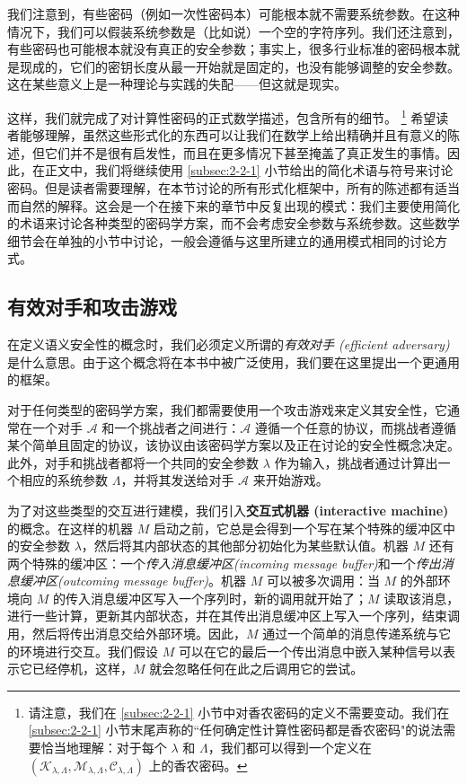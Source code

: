 我们注意到，有些密码（例如一次性密码本）可能根本就不需要系统参数。在这种情况下，我们可以假装系统参数是（比如说）一个空的字符序列。我们还注意到，有些密码也可能根本就没有真正的安全参数；事实上，很多行业标准的密码根本就是现成的，它们的密钥长度从最一开始就是固定的，也没有能够调整的安全参数。这在某些意义上是一种理论与实践的失配——但这就是现实。

这样，我们就完成了对计算性密码的正式数学描述，包含所有的细节。
\footnote{
请注意，我们在 \ref{subsec:2-2-1} 小节中对香农密码的定义不需要变动。我们在 \ref{subsec:2-2-1} 小节末尾声称的``任何确定性计算性密码都是香农密码"的说法需要恰当地理解：对于每个 $\lambda$ 和 $\Lambda$，我们都可以得到一个定义在 $(\mathcal{K}_{\lambda,\Lambda},\mathcal{M}_{\lambda,\Lambda},\mathcal{C}_{\lambda,\Lambda})$ 上的香农密码。
}
希望读者能够理解，虽然这些形式化的东西可以让我们在数学上给出精确并且有意义的陈述，但它们并不是很有启发性，而且在更多情况下甚至掩盖了真正发生的事情。因此，在正文中，我们将继续使用 \ref{subsec:2-2-1} 小节给出的简化术语与符号来讨论密码。但是读者需要理解，在本节讨论的所有形式化框架中，所有的陈述都有适当而自然的解释。这会是一个在接下来的章节中反复出现的模式：我们主要使用简化的术语来讨论各种类型的密码学方案，而不会考虑安全参数与系统参数。这些数学细节会在单独的小节中讨论，一般会遵循与这里所建立的通用模式相同的讨论方式。

\subsection{有效对手和攻击游戏}\label{subsec:2-3-3}

在定义语义安全性的概念时，我们必须定义所谓的\emph{有效对手 (efficient adversary)}是什么意思。由于这个概念将在本书中被广泛使用，我们要在这里提出一个更通用的框架。

对于任何类型的密码学方案，我们都需要使用一个攻击游戏来定义其安全性，它通常在一个对手 $\mathcal{A}$ 和一个挑战者之间进行：$\mathcal{A}$ 遵循一个任意的协议，而挑战者遵循某个简单且固定的协议，该协议由该密码学方案以及正在讨论的安全性概念决定。此外，对手和挑战者都将一个共同的安全参数 $\lambda$ 作为输入，挑战者通过计算出一个相应的系统参数 $\Lambda$，并将其发送给对手 $\mathcal{A}$ 来开始游戏。

为了对这些类型的交互进行建模，我们引入\textbf{交互式机器 (interactive machine)}的概念。在这样的机器 $M$ 启动之前，它总是会得到一个写在某个特殊的缓冲区中的安全参数 $\lambda$，然后将其内部状态的其他部分初始化为某些默认值。机器 $M$ 还有两个特殊的缓冲区：一个\emph{传入消息缓冲区(incoming message buffer)}和一个\emph{传出消息缓冲区(outcoming message buffer)}。机器 $M$ 可以被多次调用：当 $M$ 的外部环境向 $M$ 的传入消息缓冲区写入一个序列时，新的调用就开始了；$M$ 读取该消息，进行一些计算，更新其内部状态，并在其传出消息缓冲区上写入一个序列，结束调用，然后将传出消息交给外部环境。因此，$M$ 通过一个简单的消息传递系统与它的环境进行交互。我们假设 $M$ 可以在它的最后一个传出消息中嵌入某种信号以表示它已经停机，这样，$M$ 就会忽略任何在此之后调用它的尝试。

